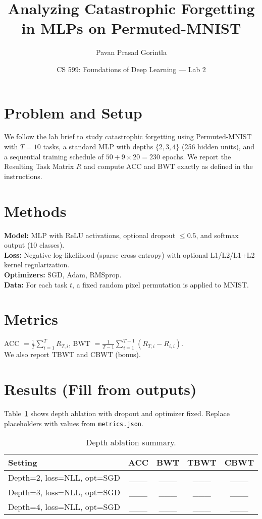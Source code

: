 \documentclass{article} %
\title{Analyzing Catastrophic Forgetting in MLPs on Permuted-MNIST}
\author{Pavan Prasad Gorintla}
\date{CS 599: Foundations of Deep Learning --- Lab 2}
\begin{document}
\maketitle

\section{Problem and Setup}
We follow the lab brief to study catastrophic forgetting using Permuted-MNIST with $T{=}10$ tasks, a standard MLP with depths $\{2,3,4\}$ (256 hidden units), and a sequential training schedule of $50 + 9\times 20 = 230$ epochs.
We report the Resulting Task Matrix $R$ and compute ACC and BWT exactly as defined in the instructions.

\section{Methods}
\textbf{Model:} MLP with ReLU activations, optional dropout $\leq 0.5$, and softmax output (10 classes).\\
\textbf{Loss:} Negative log-likelihood (sparse cross entropy) with optional L1/L2/L1+L2 kernel regularization.\\
\textbf{Optimizers:} SGD, Adam, RMSprop.\\
\textbf{Data:} For each task $t$, a fixed random pixel permutation is applied to MNIST.

\section{Metrics}
ACC $= \frac{1}{T}\sum_{i=1}^{T} R_{T,i}$,\quad
BWT $= \frac{1}{T-1}\sum_{i=1}^{T-1} (R_{T,i} - R_{i,i})$.\\
We also report TBWT and CBWT (bonus).

\section{Results (Fill from outputs)}
Table~\ref{tab:depth} shows depth ablation with dropout and optimizer fixed.
Replace placeholders with values from \texttt{metrics.json}.

\begin{table}[h]
\centering
\begin{tabular}{lcccc}
\toprule
Setting & ACC & BWT & TBWT & CBWT \\
\midrule
Depth=2, loss=NLL, opt=SGD & \_\_\_ & \_\_\_ & \_\_\_ & \_\_\_ \\
Depth=3, loss=NLL, opt=SGD & \_\_\_ & \_\_\_ & \_\_\_ & \_\_\_ \\
Depth=4, loss=NLL, opt=SGD & \_\_\_ & \_\_\_ & \_\_\_ & \_\_\_ \\
\bottomrule
\end{tabular}
\caption{Depth ablation summary.}
\label{tab:depth}
\end{table}
\end{document}

